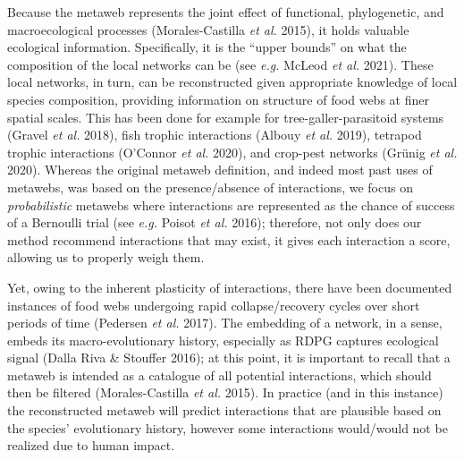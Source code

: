 \documentclass[10pt,oneside]{article}
\begin{document}
Because the metaweb represents the joint effect of functional,
phylogenetic, and macroecological processes (Morales-Castilla \emph{et
al.} 2015), it holds valuable ecological information. Specifically, it
is the ``upper bounds'' on what the composition of the local networks
can be (see \emph{e.g.} McLeod \emph{et al.} 2021). These local
networks, in turn, can be reconstructed given appropriate knowledge of
local species composition, providing information on structure of food
webs at finer spatial scales. This has been done for example for
tree-galler-parasitoid systems (Gravel \emph{et al.} 2018), fish trophic
interactions (Albouy \emph{et al.} 2019), tetrapod trophic interactions
(O'Connor \emph{et al.} 2020), and crop-pest networks (Grünig \emph{et
al.} 2020). Whereas the original metaweb definition, and indeed most
past uses of metawebs, was based on the presence/absence of
interactions, we focus on \emph{probabilistic} metawebs where
interactions are represented as the chance of success of a Bernoulli
trial (see \emph{e.g.} Poisot \emph{et al.} 2016); therefore, not only
does our method recommend interactions that may exist, it gives each
interaction a score, allowing us to properly weigh them.

Yet, owing to the inherent plasticity of interactions, there have been
documented instances of food webs undergoing rapid collapse/recovery
cycles over short periods of time (Pedersen \emph{et al.} 2017). The
embedding of a network, in a sense, embeds its macro-evolutionary
history, especially as RDPG captures ecological signal (Dalla Riva \&
Stouffer 2016); at this point, it is important to recall that a metaweb
is intended as a catalogue of all potential interactions, which should
then be filtered (Morales-Castilla \emph{et al.} 2015). In practice (and
in this instance) the reconstructed metaweb will predict interactions
that are plausible based on the species' evolutionary history, however
some interactions would/would not be realized due to human impact.
\end{document}
